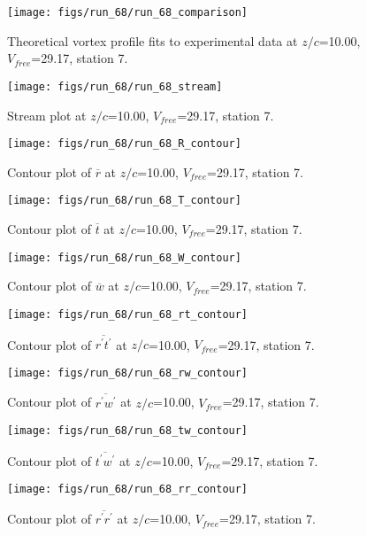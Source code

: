 \begin{figure}[H]
\centering
\texttt{[image: figs/run\_68/run\_68\_comparison]}
\caption{Theoretical vortex profile fits to experimental data at $z/c$=10.00, $V_{free}$=29.17, station 7.}
\end{figure}


\begin{figure}[H]
\centering
\texttt{[image: figs/run\_68/run\_68\_stream]}
\caption{Stream plot at $z/c$=10.00, $V_{free}$=29.17, station 7.}
\end{figure}


\begin{figure}[H]
\centering
\texttt{[image: figs/run\_68/run\_68\_R\_contour]}
\caption{Contour plot of $\overline{r}$ at $z/c$=10.00, $V_{free}$=29.17, station 7.}
\end{figure}


\begin{figure}[H]
\centering
\texttt{[image: figs/run\_68/run\_68\_T\_contour]}
\caption{Contour plot of $\overline{t}$ at $z/c$=10.00, $V_{free}$=29.17, station 7.}
\end{figure}


\begin{figure}[H]
\centering
\texttt{[image: figs/run\_68/run\_68\_W\_contour]}
\caption{Contour plot of $\overline{w}$ at $z/c$=10.00, $V_{free}$=29.17, station 7.}
\end{figure}


\begin{figure}[H]
\centering
\texttt{[image: figs/run\_68/run\_68\_rt\_contour]}
\caption{Contour plot of $\overline{r^\prime t^\prime}$ at $z/c$=10.00, $V_{free}$=29.17, station 7.}
\end{figure}


\begin{figure}[H]
\centering
\texttt{[image: figs/run\_68/run\_68\_rw\_contour]}
\caption{Contour plot of $\overline{r^\prime w^\prime}$ at $z/c$=10.00, $V_{free}$=29.17, station 7.}
\end{figure}


\begin{figure}[H]
\centering
\texttt{[image: figs/run\_68/run\_68\_tw\_contour]}
\caption{Contour plot of $\overline{t^\prime w^\prime}$ at $z/c$=10.00, $V_{free}$=29.17, station 7.}
\end{figure}


\begin{figure}[H]
\centering
\texttt{[image: figs/run\_68/run\_68\_rr\_contour]}
\caption{Contour plot of $\overline{r^\prime r^\prime}$ at $z/c$=10.00, $V_{free}$=29.17, station 7.}
\end{figure}


